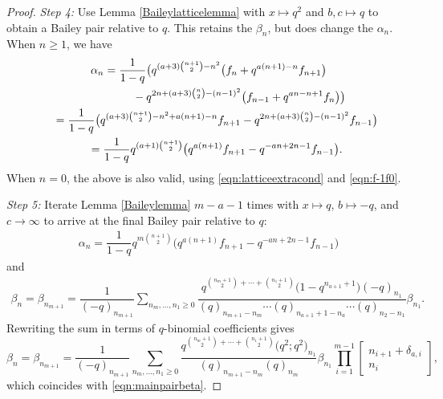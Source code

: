 \documentclass[pdftex]{sigma}
\numberwithin{equation}{section}
\begin{document}
\begin{proof}
	
	{\it Step 4\emph{:}} Use Lemma \ref{Baileylatticelemma} with $x \mapsto q^2$ and $b,c \mapsto q$ to obtain a Bailey pair relative to $q$. This retains the $\beta_n$, but does change the $\alpha_n$. When $n \geq 1$, we have
	\begin{gather*}
		\alpha_n = \dfrac{1}{1-q}
		\bigl(
		q^{(a+3)\binom{n+1}{2}-n^2}\bigl(f_n+q^{a(n+1)-n}f_{n+1}\bigr) \\ \hphantom{\alpha_n = \dfrac{1}{1-q}\bigl(}{}
		- q^{2n+(a+3)\binom{n}{2}-(n-1)^2}\bigl(f_{n-1}+q^{an-n+1}f_{n}\bigr)
		\bigr)\\ \hphantom{\alpha_n}{}
		=
		\dfrac{1}{1-q}
		\bigl(
		q^{(a+3)\binom{n+1}{2}-n^2+a(n+1)-n}f_{n+1}
		-
		q^{2n+(a+3)\binom{n}{2}-(n-1)^2}f_{n-1}
		\bigr)\\ \hphantom{\alpha_n}{}
		= \dfrac{1}{1-q}q^{(a+1)\binom{n+1}{2}}\bigl(
		q^{a(n+1)}f_{n+1} -q^{-an+2n-1}f_{n-1}
		\bigr).
	\end{gather*}
	When $n=0$, the above is also valid, using \eqref{eqn:latticeextracond} and \eqref{eqn:f-1f0}.
	
	
	{\it Step 5\emph{:}} Iterate Lemma \ref{Baileylemma} $m-a-1$ times with $x\mapsto q$, $b\mapsto -q$, and $c\rightarrow \infty$ to arrive at the final Bailey pair relative to $q$:
	\begin{align*}
		\alpha_n
		=
		\dfrac{1}{1-q}q^{m\binom{n+1}{2}}\bigl(
		q^{a(n+1)}f_{n+1} -q^{-an+2n-1}f_{n-1}
		\bigr)
	\end{align*}
	and
	\begin{align*}
		\beta_n=\beta_{n_{m+1}}=
		\dfrac{1}{(-q)_{n_{m+1}}}\sum_{n_m,\dots,n_1\geq 0}
		\dfrac{q^{\binom{n_{m}+1}{2}+\cdots+\binom{n_1+1}{2}}\bigl(1-q^{n_{a+1}+1}\bigr)(-q)_{n_1}}
		{(q)_{n_{m+1}-n_{m}}\cdots
			(q)_{n_{a+1}+1-n_a}\cdots (q)_{n_2-n_1}}\beta_{n_1}.
	\end{align*}
	Rewriting the sum in terms of $q$-binomial coefficients gives{\samepage
	\begin{equation*} %
		\beta_n = \beta_{n_{m+1}} = \frac{1}{(-q)_{n_{m+1}}} \sum_{n_m, \dots, n_1 \geq 0} \frac{q^{\binom{n_m+1}{2} + \cdots + \binom{n_1+1}{2}}\bigl(q^2;q^2\bigr)_{n_1}}{(q)_{n_{m+1}-n_m} (q)_{n_m}} \beta_{n_1} \prod_{i=1}^{m-1} \begin{bmatrix} n_{i+1} + \delta_{a,i} \\ n_i \end{bmatrix},
	\end{equation*}
	which coincides with \eqref{eqn:mainpairbeta}.}
	

\end{proof}
\end{document}
